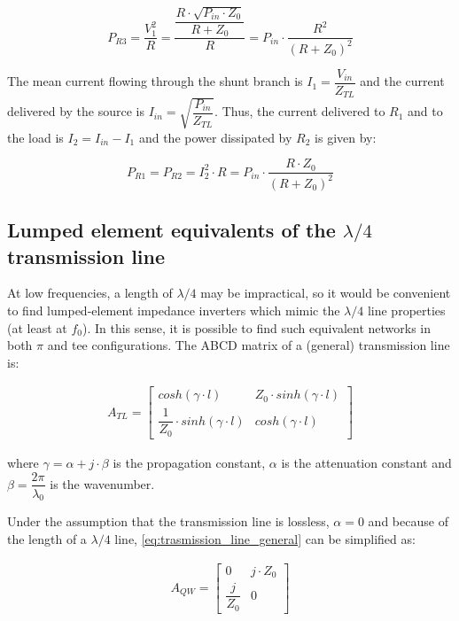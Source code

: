 \begin{equation}
P_{R3} = \dfrac{V_1^2}{R} = \dfrac{\dfrac{R \cdot \sqrt{P_{in} \cdot Z_0}}{R + Z_0}}{R} = P_{in} \cdot \dfrac{R^2}{(R + Z_0)^2}
\end{equation}

\noindent The mean current flowing through the shunt branch is $I_{1} = \dfrac{V_{in}}{Z_{TL}}$ and the current delivered by the source is $I_{in} = \sqrt{\dfrac{P_{in}}{Z_{TL}}}$. Thus, the current delivered to $R_1$ and to the load is $I_{2} = I_{in} - I_{1}$ and the power dissipated by $R_2$ is given by:

\begin{equation}
P_{R1} = P_{R2} = I_{2}^2 \cdot R = P_{in} \cdot \dfrac{R \cdot Z_0}{(R + Z_0)^2}
\end{equation}

\clearpage
\subsection{Lumped element equivalents of the $\lambda/4$ transmission line}

\noindent At low frequencies, a length of $\lambda/4$ may be impractical, so it would be convenient to find lumped-element impedance inverters which mimic the $\lambda/4$ line properties (at least at $f_0$). In this sense, it is possible to find such equivalent networks in both $\pi$ and tee configurations. The ABCD matrix of a (general) transmission line is:

\begin{gather}
  A_{TL} = 
 \begin{bmatrix} cosh(\gamma \cdot l) & Z_0 \cdot sinh(\gamma \cdot l) \\ \dfrac{1}{Z_0} \cdot sinh(\gamma \cdot l) & cosh(\gamma \cdot l) \end{bmatrix}
\label{eq:trasmission_line_general}
\end{gather}

\noindent where $\gamma = \alpha + j \cdot \beta$ is the propagation constant, $\alpha$ is the attenuation constant and $\beta = \dfrac{2\pi}{\lambda_0}$ is the wavenumber.
\medskip

\noindent Under the assumption that the transmission line is lossless, $\alpha = 0$ and because of the length of a $\lambda/4$ line, \ref{eq:trasmission_line_general} can be simplified as:

\begin{gather}
  A_{QW} = 
\begin{bmatrix} 0 & j \cdot Z_0 \\ \dfrac{j}{Z_0}  & 0 \end{bmatrix}
 \label{eq:qw-line}
\end{gather}

